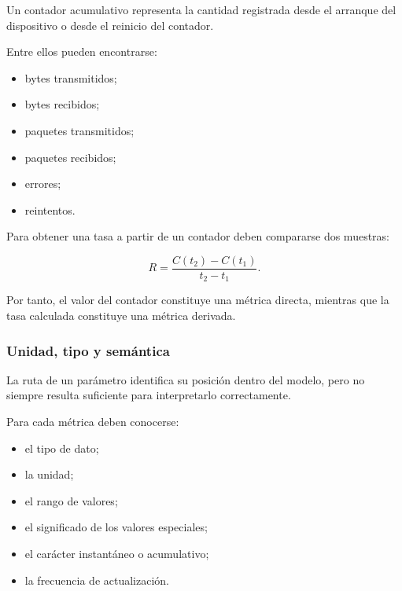 Un contador acumulativo representa la cantidad registrada desde el
arranque del dispositivo o desde el reinicio del contador.

Entre ellos pueden encontrarse:

\begin{itemize}
    \item bytes transmitidos;

    \item bytes recibidos;

    \item paquetes transmitidos;

    \item paquetes recibidos;

    \item errores;

    \item reintentos.
\end{itemize}

Para obtener una tasa a partir de un contador deben compararse dos
muestras:

\[
    R =
    \frac{
        C(t_2)-C(t_1)
    }{
        t_2-t_1
    }.
\]

Por tanto, el valor del contador constituye una métrica directa, mientras
que la tasa calculada constituye una métrica derivada.


\subsubsection*{Unidad, tipo y semántica}

La ruta de un parámetro identifica su posición dentro del modelo, pero no
siempre resulta suficiente para interpretarlo correctamente.

Para cada métrica deben conocerse:

\begin{itemize}
    \item el tipo de dato;

    \item la unidad;

    \item el rango de valores;

    \item el significado de los valores especiales;

    \item el carácter instantáneo o acumulativo;

    \item la frecuencia de actualización.
\end{itemize}

